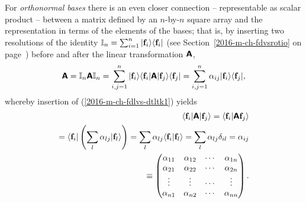 For {\em orthonormal bases}
there is an even closer connection -- representable as scalar product -- between a matrix
defined by an $n$-by-$n$ square array and the representation in terms of the elements of the bases; that is,
 by inserting
two resolutions of the identity
${\Bbb I}_n = \sum_{i=1}^n
\vert {\bf f}_i\rangle \langle {\bf f}_i \vert$
(see Section~\ref{2016-m-ch-fdvsrotio} on page~\pageref{2016-m-ch-fdvsrotio}) before and after the
linear transformation $\textsf{\textbf{A}}$,
\begin{equation}
\textsf{\textbf{A}}  =
{\Bbb I}_n \textsf{\textbf{A}} {\Bbb I}_n  =
\sum_{i,j=1}^n
\vert {\bf f}_i\rangle \langle {\bf f}_i\vert \textsf{\textbf{A}}\vert {\bf f}_j\rangle \langle {\bf f}_j\vert  =
\sum_{i,j=1}^n \alpha_{ij}
\vert {\bf f}_i\rangle  \langle {\bf f}_j\vert,
\end{equation}
whereby  insertion of (\ref{2016-m-ch-fdlvs-dtltk1}) yields
\begin{equation}
\begin{split}
 \langle {\bf f}_i \vert \textsf{\textbf{A}} \vert {\bf f}_j\rangle
= \langle {\bf f}_i \vert \textsf{\textbf{A}}   {\bf f}_j\rangle \\
= \langle {\bf f}_i \vert \left( \sum_l \alpha_{lj}\vert {\bf f}_l \rangle \right)
=  \sum_l \alpha_{lj} \langle {\bf f}_i \vert {\bf f}_l \rangle
=  \sum_l \alpha_{lj} \delta_{il}  = \alpha_{ij} \\
\equiv
\begin{pmatrix}
\alpha_{11}&
\alpha_{12}&
\cdots    &
\alpha_{1n}\\
\alpha_{21}&
\alpha_{22}&
\cdots    &
\alpha_{2n}\\
\vdots&
\vdots&
\cdots    &
\vdots\\
\alpha_{n1}&
\alpha_{n2}&
\cdots   &
\alpha_{nn}
\end{pmatrix}
.
\end{split}
\end{equation}






